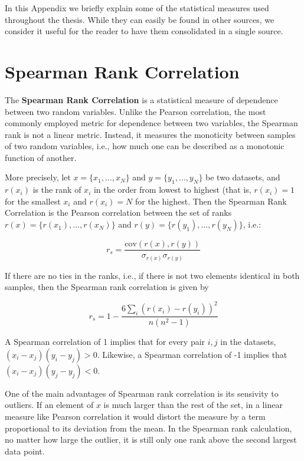 In this Appendix we briefly explain some of the statistical measures used throughout the thesis. While they can easily be found in other sources, we consider it useful for the reader to have them consolidated in a single source.

\section{Spearman Rank Correlation}

The \textbf{Spearman Rank Correlation} is a statistical measure of dependence between two random variables. Unlike the Pearson correlation, the most commonly employed metric for dependence between two variables, the Spearman rank is not a linear metric. Instead, it measures the monoticity between samples of two random variables, i.e., how much one can be described as a monotonic function of another. 

More precisely, let $x = \{x_1, \ldots, x_N\}$ and $y = \{y_1, \ldots, y_N\}$ be two datasets, and $r(x_i)$ is the rank of $x_i$ in the order from lowest to highest (that is, $r(x_i) = 1$ for the smallest $x_i$ and $r(x_i) = N$ for the highest. Then the Spearman Rank Correlation is the Pearson correlation between the set of ranks $r(x) = \{r(x_1), \ldots, r(x_N)\}$ and $r(y) = \{r(y_1), \ldots, r(y_N)\}$, i.e.:

\begin{equation}
  r_s = \frac{\text{cov}(r(x), r(y))}{\sigma_{r(x)} \sigma_{r(y)}}
\end{equation}

If there are no ties in the ranks, i.e., if there is not two elements identical in both samples, then the Spearman rank correlation is given by

\begin{equation}
  r_s = 1 - \frac{6 \sum_i \left(r(x_i) - r(y_i)\right)^2}{n (n^2 - 1)}
\end{equation}

A Spearman correlation of 1 implies that for every pair $i, j$ in the datasets, $(x_i - x_j)(y_i - y_j) > 0$. Likewise, a Spearman correlation of -1 implies that $(x_i - x_j)(y_j - y_j) < 0$.

One of the main advantages of Spearman rank correlation is its sensivity to outliers. If an element of $x$ is much larger than the rest of the set, in a linear measure like Pearson correlation it would distort the measure by a term proportional to its deviation from the mean. In the Spearman rank calculation, no matter how large the outlier, it is still only one rank above the second largest data point.


